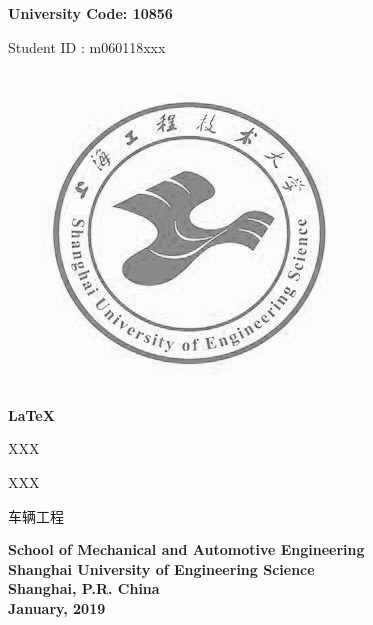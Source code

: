 

\begin{titlepage}

    {\noindent \songti\sihao\bfseries
            \hspace{18em} University Code: 10856
    
            \hspace{17em} Student \quad ID : m060118xxx
    }
    
    \begin{center}
            \includegraphics[scale=0.4]{images/logo}
    \end{center}
    
    \begin{center}\songti\yihao\bfseries
            \LaTeX
    \end{center}
    
    \vspace{4cm}
    \begin{description}[
                    labelindent=4.5cm,
                    topsep=1cm,
                    format=\sanhao
            ]\songti\sanhao
            \item[Candidate:] XXX
            \item[Supervisor:] XXX
            \item[\qquad Major:] 车辆工程
    \end{description}
    
    \vspace{1cm}
    \begin{center}\sanhao\textbf{
        School of Mechanical and Automotive Engineering \\
        Shanghai University of Engineering Science \\
        Shanghai, P.R. China \\
        January, 2019
    }
    \end{center}
    
\end{titlepage}